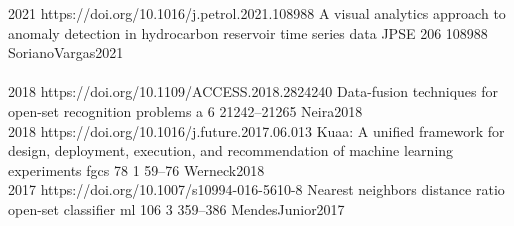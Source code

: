 \begin{publications}
  {
  }
  {2021}
  {https://doi.org/10.1016/j.petrol.2021.108988}
  {A visual analytics approach to anomaly detection in hydrocarbon reservoir time series data}
  {JPSE}
  {206}
  {}
  {108988}
  {SorianoVargas2021}
  \\

  \\

  {
  }
  {2018}
  {https://doi.org/10.1109/ACCESS.2018.2824240}
  {Data-fusion techniques for open-set recognition problems}
  {a}
  {6}
  {}
  {21242--21265}
  {Neira2018}
  \\

  {
  }
  {2018}
  {https://doi.org/10.1016/j.future.2017.06.013}
  {Kuaa: A unified framework for design, deployment, execution, and recommendation of machine learning experiments}
  {fgcs}
  {78}
  {1}
  {59--76}
  {Werneck2018}
  \\

  {
  }
  {2017}
  {https://doi.org/10.1007/s10994-016-5610-8}
  {Nearest neighbors distance ratio open-set classifier}
  {ml}
  {106}
  {3}
  {359--386}
  {MendesJunior2017}
  \\


\end{publications}
